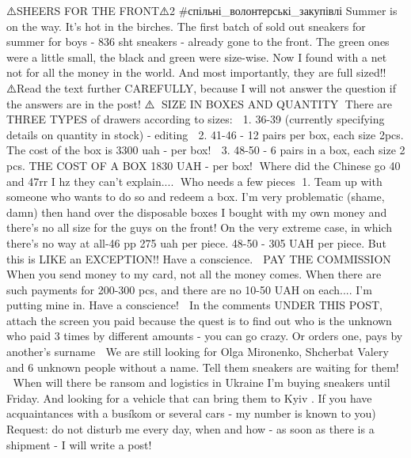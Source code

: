  
 
 
 
 

⚠️SHEERS FOR THE FRONT⚠️2
#спільні_волонтерські_закупівлі
Summer is on the way. It's hot in the birches.
The first batch of sold out sneakers for summer for boys - 836 sht sneakers - already gone to the front.
The green ones were a little small, the black and green were size-wise.
Now I found with a net not for all the money in the world.
And most importantly, they are full sized!!
⚠️Read the text further CAREFULLY, because I will not answer the question if the answers are in the post! ⚠️
🔴SIZE IN BOXES AND QUANTITY🔴
There are THREE TYPES of drawers according to sizes:
👟 1. 36-39 (currently specifying details on quantity in stock) - editing
👟 2. 41-46 - 12 pairs per box, each size 2pcs.
The cost of the box is 3300 uah - per box!
👟 3. 48-50 - 6 pairs in a box, each size 2 pcs.
THE COST OF A BOX 1830 UAH - per box!
🤔Where did the Chinese go 40 and 47rr I hz they can't explain....
🔴Who needs a few pieces🔴
1. Team up with someone who wants to do so and redeem a box.
I'm very problematic (shame, damn) then hand over the disposable boxes I bought with my own money and there's no all size for the guys on the front!
On the very extreme case, in which there's no way at all-46 pp 275 uah per piece.
48-50 - 305 UAH per piece.
But this is LIKE an EXCEPTION!! Have a conscience.
🔴 PAY THE COMMISSION 🔴
When you send money to my card, not all the money comes.
When there are such payments for 200-300 pcs, and there are no 10-50 UAH on each.... I'm putting mine in.
Have a conscience!
🔴 In the comments UNDER THIS POST, attach the screen you paid because the quest is to find out who is the unknown who paid 3 times by different amounts - you can go crazy. Or orders one, pays by another's surname 🙈
We are still looking for Olga Mironenko, Shcherbat Valery and 6 unknown people without a name. Tell them sneakers are waiting for them!
🔴 When will there be ransom and logistics in Ukraine
I'm buying sneakers until Friday.
And looking for a vehicle that can bring them to Kyiv .
If you have acquaintances with a busíkom or several cars - my number is known to you)
Request: do not disturb me every day, when and how - as soon as there is a shipment - I will write a post!
